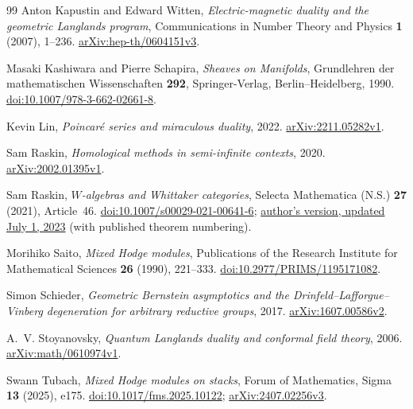 \begin{thebibliography}{99}
Anton Kapustin and Edward Witten,
\emph{Electric-magnetic duality and the geometric Langlands program},
Communications in Number Theory and Physics \textbf{1} (2007), 1--236.
\href{https://arxiv.org/abs/hep-th/0604151v3}{arXiv:hep-th/0604151v3}.

Masaki Kashiwara and Pierre Schapira,
\emph{Sheaves on Manifolds}, Grundlehren der mathematischen Wissenschaften
\textbf{292}, Springer-Verlag, Berlin--Heidelberg, 1990.
\href{https://doi.org/10.1007/978-3-662-02661-8}{doi:10.1007/978-3-662-02661-8}.

Kevin Lin,
\emph{Poincar\'e series and miraculous duality}, 2022.
\href{https://arxiv.org/abs/2211.05282v1}{arXiv:2211.05282v1}.

Sam Raskin,
\emph{Homological methods in semi-infinite contexts}, 2020.
\href{https://arxiv.org/abs/2002.01395v1}{arXiv:2002.01395v1}.

Sam Raskin,
\emph{$W$-algebras and Whittaker categories},
Selecta Mathematica (N.S.) \textbf{27} (2021), Article~46.
\href{https://doi.org/10.1007/s00029-021-00641-6}{doi:10.1007/s00029-021-00641-6};
\href{https://www.samraskin.net/whit.pdf}{author's version, updated July 1, 2023}
(with published theorem numbering).

Morihiko Saito,
\emph{Mixed Hodge modules},
Publications of the Research Institute for Mathematical Sciences
\textbf{26} (1990), 221--333.
\href{https://doi.org/10.2977/PRIMS/1195171082}{doi:10.2977/PRIMS/1195171082}.

Simon Schieder,
\emph{Geometric Bernstein asymptotics and the Drinfeld--Lafforgue--Vinberg
degeneration for arbitrary reductive groups}, 2017.
\href{https://arxiv.org/abs/1607.00586v2}{arXiv:1607.00586v2}.

A.~V. Stoyanovsky,
\emph{Quantum Langlands duality and conformal field theory}, 2006.
\href{https://arxiv.org/abs/math/0610974v1}{arXiv:math/0610974v1}.

Swann Tubach,
\emph{Mixed Hodge modules on stacks},
Forum of Mathematics, Sigma \textbf{13} (2025), e175.
\href{https://doi.org/10.1017/fms.2025.10122}{doi:10.1017/fms.2025.10122};
\href{https://arxiv.org/abs/2407.02256v3}{arXiv:2407.02256v3}.

\end{thebibliography}
